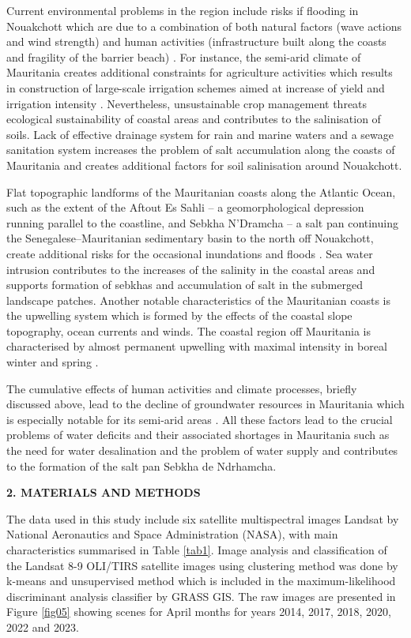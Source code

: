 \documentclass[12pt,a4paper,oneside]{article}
\def \newsection{\vspace{12pt}\textbf}
\def \newpar{\vspace{6pt}}
\begin{document}
\newpar Current environmental problems in the region include risks if flooding in Nouakchott which are due to a combination of both natural factors (wave actions and wind strength) \citep{semega2008energie} and human activities (infrastructure built along the coasts and fragility of the barrier beach) \citep{Senhoury2016,ould2007risques}. For instance, the semi-arid climate of Mauritania creates additional constraints for agriculture activities which results in construction of large-scale irrigation schemes aimed at increase of yield and irrigation intensity \citep{BORGIA20121}. Nevertheless, unsustainable crop management threats ecological sustainability of coastal areas and contributes to the salinisation of soils. Lack of effective drainage system for rain and marine waters and a sewage sanitation system increases the problem of salt accumulation along the coasts of Mauritania and creates additional factors for soil salinisation around Nouakchott. 

\newpar Flat topographic landforms of the Mauritanian coasts along the Atlantic Ocean, such as the extent of the Aftout Es Sahli -- a geomorphological depression running parallel to the coastline, and Sebkha N'Dramcha -- a salt pan continuing the Senegalese–Mauritanian sedimentary basin to the north off Nouakchott, create additional risks for the occasional inundations and floods \citep{Vermeer2010}. Sea water intrusion contributes to the increases of the salinity in the coastal areas and supports formation of sebkhas and accumulation of salt in the submerged landscape patches. Another notable characteristics of the Mauritanian coasts is the upwelling system which is formed by the effects of the coastal slope topography, ocean currents and winds. The coastal region off Mauritania is characterised by almost permanent upwelling with maximal intensity in boreal winter and spring \citep{Versteegh}.

\newpar The cumulative effects of human activities and climate processes, briefly discussed above, lead to the decline of groundwater resources in Mauritania which is especially notable for its semi-arid areas   \citep{MOHAMED2017280}. All these factors lead to the crucial problems of water deficits and their associated shortages in Mauritania such as the need for water desalination and the problem of water supply \citep{BAYODRUJULA201099} and contributes to the formation of the salt pan Sebkha de Ndrhamcha. 

\newsection {2. MATERIALS AND METHODS}

\newpar The data used in this study include six satellite multispectral images Landsat by National Aeronautics and Space Administration (NASA), with main characteristics summarised in Table \ref{tab1}. Image analysis and classification of the Landsat 8-9 OLI/TIRS satellite images using clustering method was done by k-means and unsupervised method which is included in the maximum-likelihood discriminant analysis classifier by GRASS GIS. The raw images are presented in Figure \ref{fig05} showing scenes for April months for years 2014, 2017, 2018, 2020, 2022 and 2023.
\end{document}
